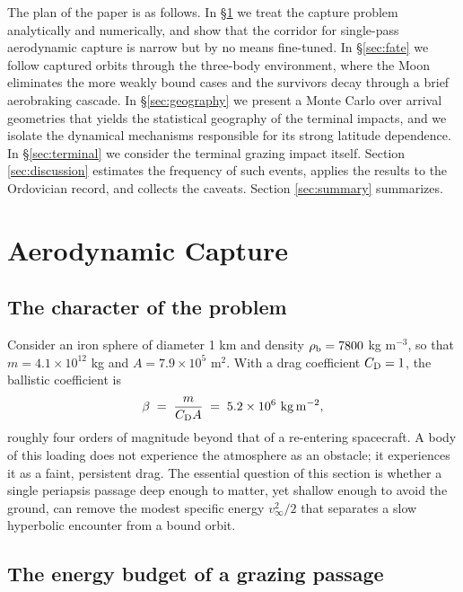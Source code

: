 \documentclass[twocolumn]{aastex701}
\newcommand{\vinf}{v_{\infty}}
\begin{document}
The plan of the paper is as follows. In \S\ref{sec:capture} we treat the
capture problem analytically and numerically, and show that the corridor
for single-pass aerodynamic capture is narrow but by no means fine-tuned.
In \S\ref{sec:fate} we follow captured orbits through the three-body
environment, where the Moon eliminates the more weakly bound cases and the
survivors decay through a brief aerobraking cascade. In \S\ref{sec:geography}
we present a Monte Carlo over arrival geometries that yields the
statistical geography of the terminal impacts, and we isolate the dynamical
mechanisms responsible for its strong latitude dependence. In
\S\ref{sec:terminal} we consider the terminal grazing impact itself.
Section \ref{sec:discussion} estimates the frequency of such events,
applies the results to the Ordovician record, and collects the caveats.
Section \ref{sec:summary} summarizes.

\section{Aerodynamic Capture} \label{sec:capture}

\subsection{The character of the problem} \label{sec:character}

Consider an iron sphere of diameter 1 km and density $\rho_{\rm b} = 7800$
kg m$^{-3}$, so that $m = 4.1\times10^{12}$ kg and $A = 7.9\times10^{5}$
m$^{2}$. With a drag coefficient $C_{\rm D} = 1$, the ballistic
coefficient is
\begin{equation}
\beta \;=\; \frac{m}{C_{\rm D}A} \;=\; 5.2\times10^{6}\ {\rm kg\,m^{-2}},
\end{equation}
roughly four orders of magnitude beyond that of a re-entering spacecraft.
A body of this loading does not experience the atmosphere as an obstacle;
it experiences it as a faint, persistent drag. The essential question of
this section is whether a single periapsis passage deep enough to matter,
yet shallow enough to avoid the ground, can remove the modest specific
energy $\vinf^{2}/2$ that separates a slow hyperbolic encounter from a
bound orbit.

\subsection{The energy budget of a grazing passage} \label{sec:budget}
\end{document}
